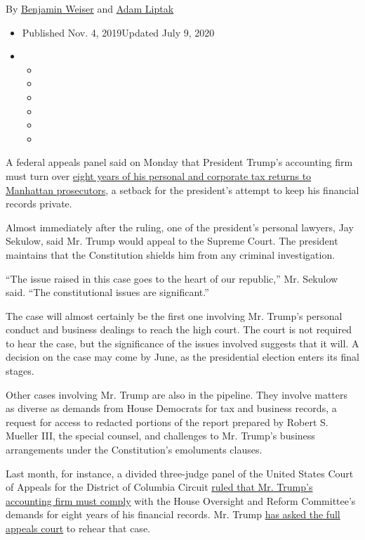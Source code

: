 By \href{https://www.nytimes.com/by/benjamin-weiser}{Benjamin Weiser}
and \href{https://www.nytimes.com/by/adam-liptak}{Adam Liptak}

\begin{itemize}
\item
  Published Nov. 4, 2019Updated July 9, 2020
\item
  \begin{itemize}
  \item
  \item
  \item
  \item
  \item
  \item
  \end{itemize}
\end{itemize}

A federal appeals panel said on Monday that President Trump's accounting
firm must turn over
\href{https://www.nytimes.com/2020/08/03/nyregion/donald-trump-taxes-cyrus-vance.html}{eight
years of his personal and corporate tax returns to Manhattan
prosecutors}, a setback for the president's attempt to keep his
financial records private.

Almost immediately after the ruling, one of the president's personal
lawyers, Jay Sekulow, said Mr. Trump would appeal to the Supreme Court.
The president maintains that the Constitution shields him from any
criminal investigation.

``The issue raised in this case goes to the heart of our republic,'' Mr.
Sekulow said. ``The constitutional issues are significant.''

The case will almost certainly be the first one involving Mr. Trump's
personal conduct and business dealings to reach the high court. The
court is not required to hear the case, but the significance of the
issues involved suggests that it will. A decision on the case may come
by June, as the presidential election enters its final stages.

Other cases involving Mr. Trump are also in the pipeline. They involve
matters as diverse as demands from House Democrats for tax and business
records, a request for access to redacted portions of the report
prepared by Robert S. Mueller III, the special counsel, and challenges
to Mr. Trump's business arrangements under the Constitution's emoluments
clauses.

Last month, for instance, a divided three-judge panel of the United
States Court of Appeals for the District of Columbia Circuit
\href{https://www.nytimes.com/2019/10/11/us/politics/mazars-trump-tax-returns.html}{ruled
that Mr. Trump's accounting firm must comply} with the House Oversight
and Reform Committee's demands for eight years of his financial records.
Mr. Trump
\href{http://cdn.cnn.com/cnn/2019/images/10/25/document1.pdf}{has asked
the full appeals court} to rehear that case.

